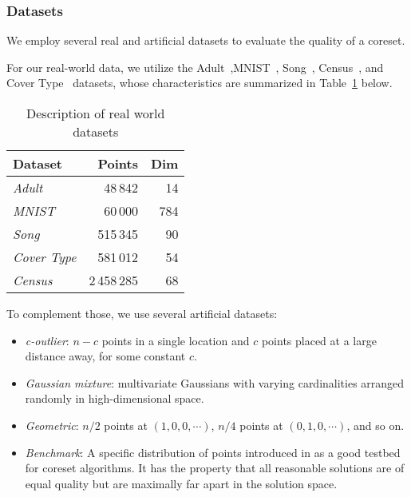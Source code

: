
\subsubsection{Datasets}


We employ several real and artificial datasets to evaluate the quality of a coreset. 

For our real-world data, we utilize the Adult~\cite{Dua:2019},MNIST~\cite{mnist}, Song~\cite{song}, Census~\cite{census}, and Cover Type~\cite{covtype} datasets, whose characteristics are summarized in 
Table~\cref{tbl:datasets} below.
\begin{table}[htbp]
    \label{tbl:datasets}
    \centering
    \begin{tabular}{lrr}
        Dataset & Points & Dim \\
        \hline
        \emph{Adult} & 48\,842 & 14 \\
        \emph{MNIST} & 60\,000 & 784 \\
        \emph{Song} & 515\,345 & 90 \\
        \emph{Cover Type} & 581\,012 & 54 \\
        \emph{Census} & 2\,458\,285 & 68
    \end{tabular}
    \caption{Description of real world datasets}
\end{table}

To complement those, we use several artificial datasets:
\begin{itemize}
    \item \emph{c-outlier}: $n-c$ points in a single location and $c$ points placed at a large distance away, for some constant $c$.
    \item \emph{Gaussian mixture}: multivariate Gaussians with varying cardinalities arranged randomly in high-dimensional space. 
    \item \emph{Geometric}: $n/2$ points at $(1, 0, 0, \cdots)$, $n/4$ points at $(0, 1, 0, \cdots)$, and so on. 
    \item \emph{Benchmark}: A specific distribution of points introduced in \cite{chrisESA} as a good testbed for coreset algorithms. 
    It has the property that all reasonable solutions are of equal quality but are maximally far
            apart in the solution space.
\end{itemize}

